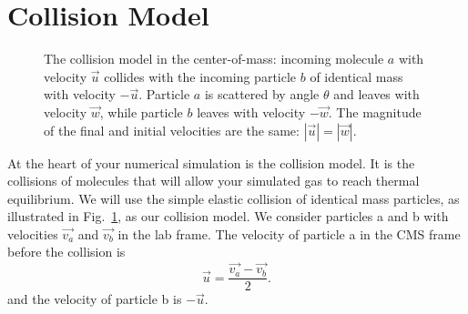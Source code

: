 \documentclass[12pt]{article}
\begin{document}
\section{Collision Model}

\begin{figure}[htbp]
  \begin{center}
\caption{The collision model in the center-of-mass:  incoming molecule $a$ with velocity $\vec{u}$ collides with the incoming particle $b$ of identical mass with velocity $-\vec{u}$.  Particle $a$ is scattered by angle $\theta$ and leaves with velocity $\vec{w}$, while particle $b$ leaves with velocity $-\vec{w}$.  The magnitude of the final and initial velocities are the same:  $|\vec{u}| = |\vec{w}|$.}
\label{fig:collcms}
\end{center}
\end{figure}

\noindent
At the heart of your numerical simulation is the collision model.  It
is the collisions of molecules that will allow your simulated gas to
reach thermal equilibrium.  We will use the simple elastic collision
of identical mass particles, as illustrated in Fig.~\ref{fig:collcms},
as our collision model.  We consider particles a and b with velocities
$\vec{v_a}$ and $\vec{v_b}$ in the lab frame.  The velocity of
particle a in the CMS frame before the collision is
\begin{displaymath}
\vec{u} = \frac{\vec{v_a} - \vec{v_b}}{2}.
\end{displaymath}
and the velocity of particle b is $-\vec{u}$.
\end{document}
